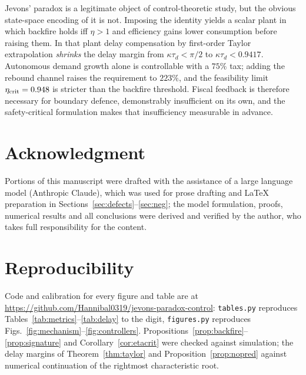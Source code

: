 \documentclass[conference,letterpaper,10pt]{IEEEtran}
\theoremstyle{plain}
\theoremstyle{remark}
\begin{document}
Jevons' paradox is a legitimate object of control-theoretic study, but
the obvious state-space encoding of it is not. Imposing the identity
yields a scalar plant in which backfire holds iff $\eta>1$ and
efficiency gains lower consumption before raising them. In that plant
delay compensation by first-order Taylor extrapolation \emph{shrinks}
the delay margin from $\kappa\tau_d<\pi/2$ to $\kappa\tau_d<0.9417$.
Autonomous demand growth alone is controllable with a $75\%$ tax;
adding the rebound channel raises the requirement to $223\%$, and the
feasibility limit $\eta_{\rm crit}=0.948$ is stricter than the backfire
threshold. Fiscal feedback is therefore necessary for boundary defence,
demonstrably insufficient on its own, and the safety-critical
formulation makes that insufficiency measurable in advance.

\section*{Acknowledgment}
Portions of this manuscript were drafted with the assistance of a large
language model (Anthropic Claude), which was used for prose drafting
and \LaTeX{} preparation in
Sections~\ref{sec:defects}--\ref{sec:neg}; the model formulation,
proofs, numerical results and all conclusions were derived and verified
by the author, who takes full responsibility for the content.

\section*{Reproducibility}
Code and calibration for every figure and table are at
\url{https://github.com/Hannibal0319/jevons-paradox-control}:
\texttt{tables.py} reproduces Tables~\ref{tab:metrics}--\ref{tab:delay}
to the digit, \texttt{figures.py} reproduces
Figs.~\ref{fig:mechanism}--\ref{fig:controllers}.
Propositions~\ref{prop:backfire}--\ref{prop:signature} and
Corollary~\ref{cor:etacrit} were checked against simulation; the delay
margins of Theorem~\ref{thm:taylor} and Proposition~\ref{prop:nopred}
against numerical continuation of the rightmost characteristic root.

\balance
\end{document}
